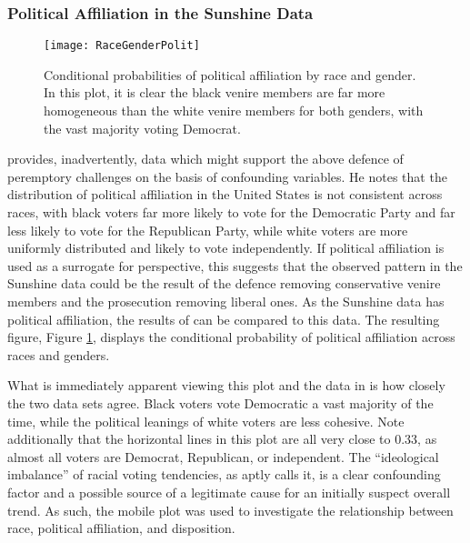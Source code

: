 \subsubsection{Political Affiliation in the Sunshine Data} \label{sec:polaff}

\begin{figure}[h!]
  \centering
  \texttt{[image: RaceGenderPolit]}
  \caption[Political Affiliation by Race and Gender (Sunshine)]
  {\footnotesize Conditional probabilities of political affiliation by race and gender. In this plot, it is clear the black venire
    members are far more homogeneous than the white venire members for both genders, with the vast majority voting Democrat.} 
  \label{fig:racepolit}
\end{figure}

\cite{revesz2016} provides, inadvertently, data which might support the above defence of peremptory challenges on the basis of
confounding variables. He notes that the distribution of political affiliation in the United States is not
consistent across races, with black voters far more likely to vote for the Democratic Party and far less likely to vote for the
Republican Party, while white voters are more uniformly distributed and likely to vote independently. If political affiliation is
used as a surrogate for perspective, this suggests that the observed pattern in the Sunshine data could be the result of the
defence removing conservative venire members and the prosecution removing liberal ones. As the Sunshine data has political
affiliation, the results of \citeauthor{revesz2016} can be compared to this data. The resulting figure, Figure
\ref{fig:racepolit}, displays the conditional probability of political affiliation across races and genders.

What is immediately apparent viewing this plot and the data in \cite{revesz2016} is how closely the two data sets agree. Black
voters vote Democratic a vast majority of the time, while the political leanings of white voters are less cohesive. Note
additionally that the horizontal lines in this plot are all very close to 0.33, as almost all voters are Democrat, Republican, or
independent. The ``ideological imbalance'' of racial voting tendencies, as \citeauthor{revesz2016} aptly calls it, is a clear
confounding factor and a possible source of a legitimate cause for an initially suspect overall trend. As such, the mobile plot
was used to investigate the relationship between race, political affiliation, and disposition.

